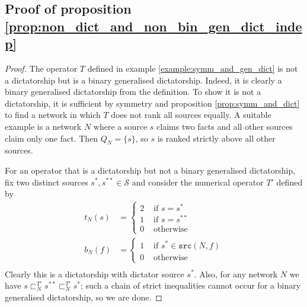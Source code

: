 \documentclass{article}
\theoremstyle{definition} \newtheorem{definition}{Definition}
\theoremstyle{definition} \newtheorem{example}{Example}
\theoremstyle{plain} \newtheorem{axiom}{Axiom}
\theoremstyle{plain} \newtheorem*{remark}{Remark}
\theoremstyle{remark} \newtheorem*{notation}{Notation}
\theoremstyle{plain} \newtheorem{lemma}{Lemma}
\theoremstyle{plain} \newtheorem{theorem}{Theorem}
\theoremstyle{plain} \newtheorem{proposition}{Proposition}
\renewcommand{\S}{\mathcal{S}}  %
\newcommand{\slt}{\sqsubset}
\newcommand{\src}{\texttt{src}}
\begin{document}
\subsection{Proof of proposition \ref{prop:non_dict_and_non_bin_gen_dict_indep}}
\begin{proof}

The operator $T$ defined in example \ref{example:symm_and_gen_dict} is not a
dictatorship but is a binary generalised dictatorship. Indeed, it is clearly a
binary generalised dictatorship from the definition. To show it is not a
dictatorship, it is sufficient by symmetry and proposition
\ref{prop:symm_and_dict} to find a network in which $T$ does not rank all
sources equally. A suitable example is a network $N$ where a source $s$ claims
two facts and all other sources claim only one fact. Then $Q_N = \{s\}$, so $s$
is ranked strictly above all other sources.

For an operator that is a dictatorship but not a binary generalised
dictatorship, fix two distinct sources $s^*, s^{**} \in \S$ and consider the
numerical operator $T'$ defined by
\begin{align*}
    t_N(s) & = \begin{cases}
        2 & \text{ if } s = s^* \\
        1 & \text{ if } s = s^{**} \\
        0 & \text{ otherwise}
    \end{cases} \\
    b_N(f) & = \begin{cases}
        1 & \text{ if } s^* \in \src(N, f) \\
        0 & \text{ otherwise}
    \end{cases} \\
\end{align*}
Clearly this is a dictatorship with dictator source $s^*$. Also, for any
network $N$ we have $s \slt_N^{T'} s^{**} \slt_N^{T'} s^*$; such a chain of
strict inequalities cannot occur for a binary generalised dictatorship, so we
are done.

\end{proof}
\end{document}
